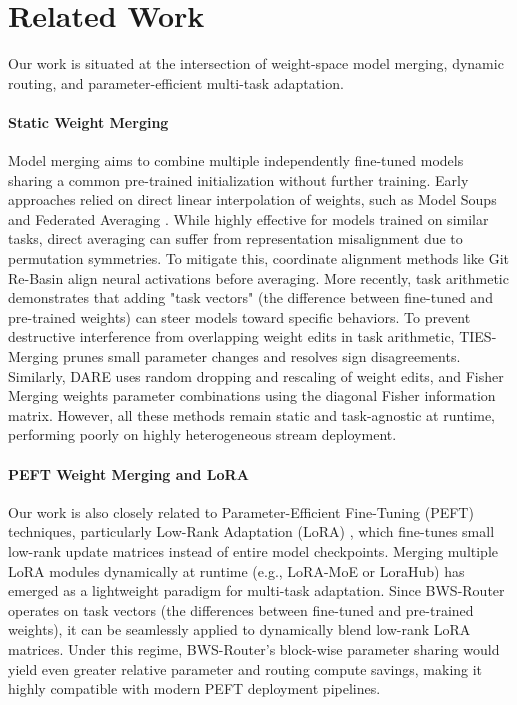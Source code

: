 \section{Related Work}
\label{sec:related_work}

Our work is situated at the intersection of weight-space model merging, dynamic routing, and parameter-efficient multi-task adaptation. 

\paragraph{Static Weight Merging}
Model merging aims to combine multiple independently fine-tuned models sharing a common pre-trained initialization without further training. Early approaches relied on direct linear interpolation of weights, such as Model Soups \cite{wortsman2022model} and Federated Averaging \cite{mcmahan2017communication}. While highly effective for models trained on similar tasks, direct averaging can suffer from representation misalignment due to permutation symmetries. To mitigate this, coordinate alignment methods like Git Re-Basin \cite{ainsworth2022git} align neural activations before averaging. More recently, task arithmetic \cite{task_arithmetic} demonstrates that adding "task vectors" (the difference between fine-tuned and pre-trained weights) can steer models toward specific behaviors. To prevent destructive interference from overlapping weight edits in task arithmetic, TIES-Merging \cite{yadav2023ties} prunes small parameter changes and resolves sign disagreements. Similarly, DARE \cite{yu2023dare} uses random dropping and rescaling of weight edits, and Fisher Merging \cite{matena2022merging} weights parameter combinations using the diagonal Fisher information matrix. However, all these methods remain static and task-agnostic at runtime, performing poorly on highly heterogeneous stream deployment.

\paragraph{PEFT Weight Merging and LoRA}
Our work is also closely related to Parameter-Efficient Fine-Tuning (PEFT) techniques, particularly Low-Rank Adaptation (LoRA) \cite{hu2021lora}, which fine-tunes small low-rank update matrices instead of entire model checkpoints. Merging multiple LoRA modules dynamically at runtime (e.g., LoRA-MoE or LoraHub) has emerged as a lightweight paradigm for multi-task adaptation. Since BWS-Router operates on task vectors (the differences between fine-tuned and pre-trained weights), it can be seamlessly applied to dynamically blend low-rank LoRA matrices. Under this regime, BWS-Router's block-wise parameter sharing would yield even greater relative parameter and routing compute savings, making it highly compatible with modern PEFT deployment pipelines.

